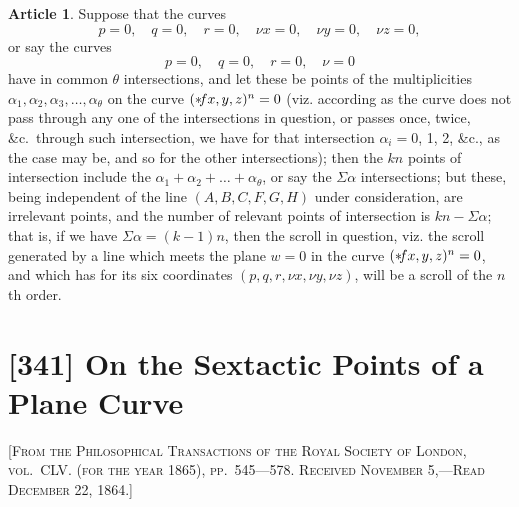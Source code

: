 \documentclass[12pt,a4paper]{article}
\theoremstyle{definition}
\newtheorem{art}{Article}[section]
\begin{document}
\begin{art}
Suppose that the curves
\[
p = 0, \quad q = 0, \quad r = 0, \quad \nu x = 0, \quad \nu y = 0, \quad \nu z = 0,
\]
or say the curves
\[
p = 0, \quad q = 0, \quad r = 0, \quad \nu = 0
\]
have in common $\theta$ intersections, and let these be points of the multiplicities $\alpha_1, \alpha_2, \alpha_3, \ldots, \alpha_\theta$ on the curve $(* \hspace{-2pt} fx, y, z)^n = 0$ (viz. according as the curve does not pass through any one of the intersections in question, or passes once, twice, \&c.\ through such intersection, we have for that intersection $\alpha_i = 0$, 1, 2, \&c., as the case may be, and so for the other intersections); then the $kn$ points of intersection include the $\alpha_1 + \alpha_2 + \ldots + \alpha_\theta$, or say the $\Sigma\alpha$ intersections; but these, being independent of the line $(A, B, C, F, G, H)$ under consideration, are irrelevant points, and the number of relevant points of intersection is $kn - \Sigma\alpha$; that is, if we have $\Sigma\alpha = (k - 1)n$, then the scroll in question, viz. the scroll generated by a line which meets the plane $w = 0$ in the curve $(* \hspace{-2pt} fx, y, z)^n = 0$, and which has for its six coordinates $(p, q, r, \nu x, \nu y, \nu z)$, will be a scroll of the $n$th order.
\end{art}

\newpage
\section{[341] On the Sextactic Points of a Plane Curve}

\begin{center}
\textsc{[From the Philosophical Transactions of the Royal Society of London, vol.~CLV. (for the year 1865), pp.~545---578. Received November 5,---Read December 22, 1864.]}
\end{center}
\end{document}
